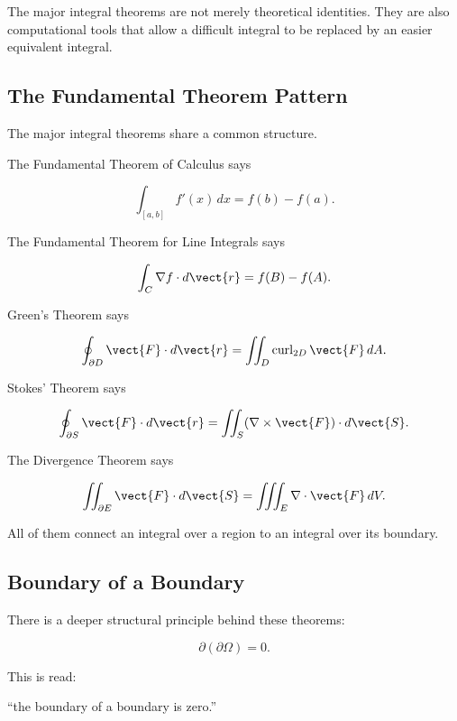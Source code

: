 \begin{importantbox}
The major integral theorems are not merely theoretical identities. They are
also computational tools that allow a difficult integral to be replaced by
an easier equivalent integral.
\end{importantbox}

\subsection{The Fundamental Theorem Pattern}
\label{subsec:fundamental-theorem-pattern}

The major integral theorems share a common structure.

The Fundamental Theorem of Calculus says

\[ \int_{[a,b]}f'(x)\,dx=f(b)-f(a). \]

The Fundamental Theorem for Line Integrals says

\[ \int_C\nabla f\cdot d\vect{r}
=f(B)-f(A). \]

Green's Theorem says

\[ \oint_{\partial D}\vect{F}\cdot d\vect{r}
=
\iint_D\operatorname{curl}_{2D}\vect{F}\,dA. \]

Stokes' Theorem says

\[ \oint_{\partial S}\vect{F}\cdot d\vect{r}
=
\iint_S(\nabla\times\vect{F})\cdot d\vect{S}. \]

The Divergence Theorem says

\[ \iint_{\partial E}\vect{F}\cdot d\vect{S}
=
\iiint_E\nabla\cdot\vect{F}\,dV. \]

All of them connect an integral over a region to an integral over its
boundary.

\subsection{Boundary of a Boundary}
\label{subsec:boundary-of-boundary}

There is a deeper structural principle behind these theorems:

\[ \boxed{\partial(\partial\Omega)=0.} \]

This is read:

``the boundary of a boundary is zero.''

